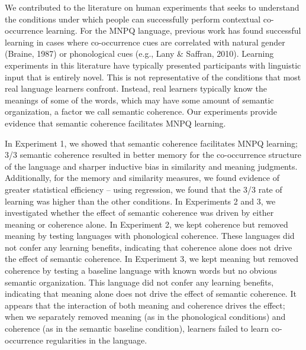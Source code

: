 \documentclass[man,floatsintext]{apa6}
\begin{document}
We contributed to the literature on human experiments that seeks to understand the conditions under which people can successfully perform contextual co-occurrence learning. For the MNPQ language, previous work has found successful learning in cases where co-occurrence cues are correlated with natural gender (Braine, 1987) or phonological cues (e.g., Lany \& Saffran, 2010). Learning experiments in this literature have typically presented participants with linguistic input that is entirely novel. This is not representative of the conditions that most real language learners confront. Instead, real learners typically know the meanings of some of the words, which may have some amount of semantic organization, a factor we call semantic coherence. Our experiments provide evidence that semantic coherence facilitates MNPQ learning.

In Experiment 1, we showed that semantic coherence facilitates MNPQ learning; 3/3 semantic coherence resulted in better memory for the co-occurrence structure of the language and sharper inductive bias in similarity and meaning judgments. Additionally, for the memory and similarity measures, we found evidence of greater statistical efficiency -- using regression, we found that the 3/3 rate of learning was higher than the other conditions. In Experiments 2 and 3, we investigated whether the effect of semantic coherence was driven by either meaning or coherence alone. In Experiment 2, we kept coherence but removed meaning by testing languages with phonological coherence. These languages did not confer any learning benefits, indicating that coherence alone does not drive the effect of semantic coherence. In Experiment 3, we kept meaning but removed coherence by testing a baseline language with known words but no obvious semantic organization. This language did not confer any learning benefits, indicating that meaning alone does not drive the effect of semantic coherence. It appears that the interaction of both meaning and coherence drives the effect; when we separately removed meaning (as in the phonological conditions) and coherence (as in the semantic baseline condition), learners failed to learn co-occurrence regularities in the language.
\end{document}

